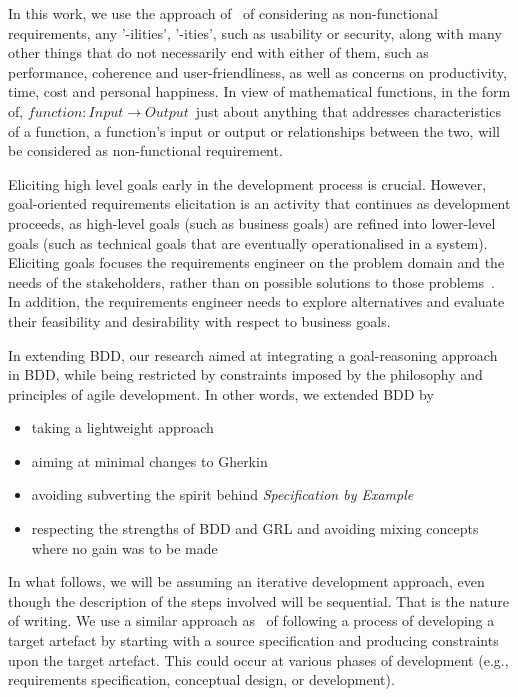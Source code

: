 \documentclass[dissertation,final]{softeng}
\begin{document}
In this work, we use the approach of~\citet{Chung:2009vg} of considering as non-functional requirements, any '-ilities', '-ities', such as usability or security, along with many other things that do not necessarily end with either of them, such as performance, coherence and user-friendliness, as well as concerns on productivity, time, cost and personal happiness. In view of mathematical functions, in the form of, $function: Input \rightarrow Output$~just about anything that addresses characteristics of a function, a function's input or output or relationships between the two, will be considered as non-functional requirement.

Eliciting high level goals early in the development process is crucial. However, goal-oriented requirements elicitation is an activity that continues as development proceeds, as high-level goals (such as business goals) are refined into lower-level goals (such as technical goals that are eventually operationalised in a system). Eliciting goals focuses the requirements engineer on the problem domain and the needs of the stakeholders, rather than on possible solutions to those problems~\citep{Nuseibeh:2000ub}. In addition, the requirements engineer needs to explore alternatives and evaluate their feasibility and desirability with respect to business goals.

In extending BDD, our research aimed at integrating a goal-reasoning approach in BDD, while being restricted by constraints imposed by the philosophy and principles of agile development. In other words, we extended BDD by 

\begin{itemize}
\item taking a lightweight approach
\item aiming at minimal changes to Gherkin
\item avoiding subverting the spirit behind \emph{Specification by Example}
\item respecting the strengths of BDD and GRL and avoiding mixing concepts where no gain was to be made
\end{itemize}

In what follows, we will be assuming an iterative development approach, even though the description of the steps involved will be sequential. That is the nature of writing. We use a similar approach as~\citet{Chung2000} of following a process of developing a target artefact by starting with a source specification and producing constraints upon the target artefact. This could occur at various phases of development (e.g., requirements specification, conceptual design, or development).
\end{document}
